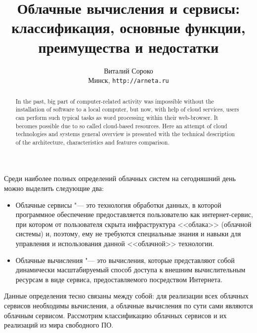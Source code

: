 \documentclass[a5paper,10pt]{article}
\begin{document}
\title{Облачные вычисления и сервисы: классификация, основные функции, преимущества и недостатки}

\author{Виталий Сороко\\ 
\small Минск, \texttt{http://arneta.ru}
}
\maketitle
\begin{abstract}
In the past, big part of computer-related activity was impos\-sible without the installation of software to a local computer, but now, with help of cloud services, users can perform such typical tasks as word processing within their web-browser. It becomes possible due to so called cloud-based resources. Here an attempt of  cloud technologies and systems general overview is presented with the technical description of the architecture, characteristics and features comparison. 
\end{abstract}

Среди наиболее полных определений облачных систем на сегодняшний день можно выделить следующие два:
\begin{itemize}
\item Облачные сервисы "--- это технология обработки данных, в которой программное обеспечение предоставляется пользователю как интернет-сервис, при котором от пользователя скрыта инфраструктура <<облака>> (облачной системы) и, поэтому, ему не требуются специальные знания и навыки для  управления и использования данной <<облачной>> технологии.
\item Облачные вычисления "--- это вычисления, которые представляют собой динамически масштабируемый способ доступа к внешним вычислительным ресурсам в виде сервиса, предоставляемого посредством Интернета.
\end{itemize}

Данные определения тесно связаны между собой: для реализации всех облачных сервисов необходимы вычисления, а облачные вычисления по сути сами являются облачным сервисом. Рассмотрим классификацию облачных сервисов и их реализаций из мира свободного ПО.
\end{document}
